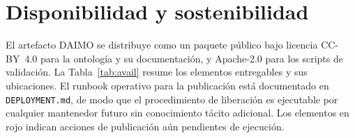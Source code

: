 \documentclass[11pt,a4paper]{article}
\newcommand{\code}[1]{\texttt{#1}}
\begin{document}
\section{Disponibilidad y sostenibilidad}\label{sec:avail}

El artefacto DAIMO se distribuye como un paquete público bajo licencia CC-BY~4.0 para la ontología y su documentación, y Apache-2.0 para los scripts de validación. La Tabla~\ref{tab:avail} resume los elementos entregables y sus ubicaciones. El runbook operativo para la publicación está documentado en \code{DEPLOYMENT.md}, de modo que el procedimiento de liberación es ejecutable por cualquier mantenedor futuro sin conocimiento tácito adicional. Los elementos en rojo indican acciones de publicación aún pendientes de ejecución.
\end{document}
